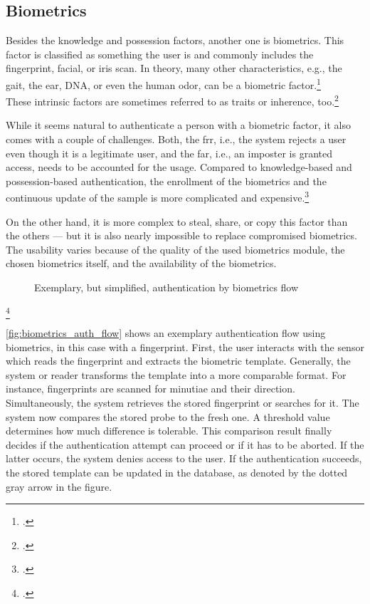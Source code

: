 \subsection{Biometrics}

Besides the knowledge and possession factors, another one is biometrics. This factor is classified as \frqq something the user is\flqq{} and commonly includes the fingerprint, facial, or iris scan. In theory, many other characteristics, e.g., the gait, the ear, DNA, or even the human odor, can be a biometric factor.\footcite[See][30--34]{Jain2011}\\
These intrinsic factors are sometimes referred to as traits or inherence, too.\footcite[See][186]{dasgupta2017multi}

While it seems natural to authenticate a person with a biometric factor, it also comes with a couple of challenges. Both, the \gls{frr}, i.e., the system rejects a user even though it is a legitimate user, and the \gls{far}, i.e., an imposter is granted access, needs to be accounted for the usage. Compared to knowledge-based and possession-based authentication, the enrollment of the biometrics and the continuous update of the sample is more complicated and expensive.\footcites[See][18--24]{Jain2011}[See][34--37]{265831}

On the other hand, it is more complex to steal, share, or copy this factor than the others --- but it is also nearly impossible to replace compromised biometrics. The usability varies because of the quality of the used biometrics module, the chosen biometrics itself, and the availability of the biometrics.

\begin{figure}[hbt]
	\centering
	
	\caption[Exemplary, but simplified, authentication by biometrics flow]{Exemplary, but simplified, authentication by biometrics flow\footnotemark}
	\label{fig:biometrics_auth_flow}
\end{figure}
\footcitetext[Source: diagram by author, based on][11]{Jain2011}

\autoref{fig:biometrics_auth_flow} shows an exemplary authentication flow using biometrics, in this case with a fingerprint. First, the user interacts with the sensor which reads the fingerprint and extracts the biometric template. Generally, the system or reader transforms the template into a more comparable format. For instance, fingerprints are scanned for minutiae and their direction. Simultaneously, the system retrieves the stored fingerprint or searches for it. The system now compares the stored probe to the fresh one. A threshold value determines how much difference is tolerable. This comparison result finally decides if the authentication attempt can proceed or if it has to be aborted. If the latter occurs, the system denies access to the user. If the authentication succeeds, the stored template can be updated in the database, as denoted by the dotted gray arrow in the figure.

